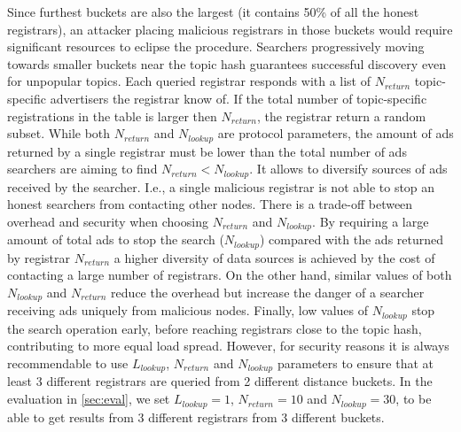 Since furthest buckets are also the largest (\ie it contains 50\% of all the honest registrars), an attacker placing malicious registrars in those buckets would require significant resources to eclipse the procedure. 
Searchers progressively moving towards smaller buckets near the topic hash guarantees successful discovery even for unpopular topics.
Each queried registrar responds with a list of $N_\textit{return}$ topic-specific advertisers the registrar know of. 
If the total number of topic-specific registrations in the table is larger then $N_\textit{return}$, the registrar return a random subset. 
While both $N_\textit{return}$ and $N_\textit{lookup}$ are protocol parameters, the amount of ads returned by a single registrar must be lower than the total number of ads searchers are aiming to find $N_\textit{return} < N_\textit{lookup}$. It allows to diversify sources of ads received by the searcher. I.e., a single malicious registrar is not able to stop an honest searchers from contacting other nodes.
There is a trade-off between overhead and security when choosing $N_\textit{return}$ and $N_\textit{lookup}$. 
By requiring a large amount of total ads to stop the search ($N_\textit{lookup}$) compared with the  ads returned by registrar $N_\textit{return}$ a higher diversity of data sources is achieved by the cost of contacting a large number of registrars. On the other hand,  similar values of both $N_\textit{lookup}$ and $N_\textit{return}$ reduce the overhead but increase the danger of a searcher receiving ads uniquely from malicious nodes. Finally,  low values of $N_\textit{lookup}$ stop the search operation early,  before reaching registrars close to the topic hash, contributing to more equal load spread. 
However,  for security reasons it is always recommendable to use $L_\textit{lookup}$, $N_\textit{return}$ and $N_\textit{lookup}$ parameters to ensure that at least 3 different registrars are queried from 2 different distance buckets.
In the evaluation in \cref{sec:eval},  we set $L_\textit{lookup}=1$, $N_\textit{return}=10$ and $N_\textit{lookup}=30$, to be able to get results from 3 different registrars from 3 different buckets.

